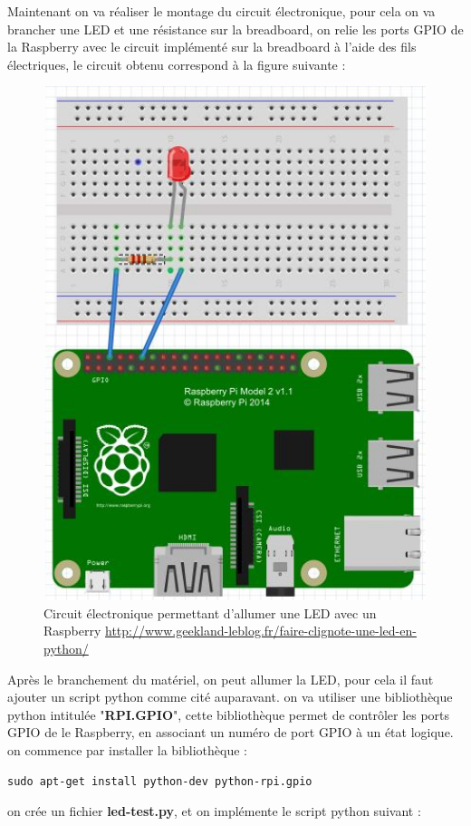\documentclass[12pt,a4paper]{article}
\begin{document}
Maintenant on va réaliser le montage du circuit électronique, pour cela on va brancher une LED et une résistance sur la breadboard, on relie les ports GPIO de la Raspberry avec le circuit implémenté sur la breadboard à l'aide des fils électriques, le circuit obtenu correspond à la figure suivante : \par
\begin{figure}[H]
  \centering
    \includegraphics[width = 15cm,height=15cm]{led.png}
     \caption{Circuit électronique permettant d'allumer une LED avec un Raspberry
     \href{url}{http://www.geekland-leblog.fr/faire-clignote-une-led-en-python/}  }
\end{figure}
Après le branchement du matériel, on peut allumer la LED, pour cela il faut ajouter un script python comme cité auparavant. on va utiliser une bibliothèque python intitulée "\textbf{RPI.GPIO}", cette bibliothèque permet de contrôler les ports GPIO de le Raspberry, en associant un numéro de port GPIO à un état logique.
on commence par installer la bibliothèque : 
\begin{lstlisting}
sudo apt-get install python-dev python-rpi.gpio
\end{lstlisting}
on crée un fichier \textbf{led-test.py}, et on implémente le script python suivant :
\end{document}
